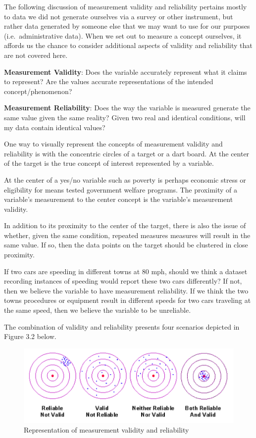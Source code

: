 \documentclass[
]{book}
\newenvironment{announcement}%
{%
  \par\vspace{\baselineskip}\noindent 
  \color{Announcement}\begin{itshape}%
  \par\vspace{\baselineskip}\noindent\ignorespaces 
}%
{%
  \end{itshape}\ignorespacesafterend 
}
\begin{document}
\begin{announcement}
The following discussion of measurement validity and reliability
pertains mostly to data we did not generate ourselves via a survey or
other instrument, but rather data generated by someone else that we may
want to use for our purposes (i.e.~administrative data). When we set out
to measure a concept ourselves, it affords us the chance to consider
additional aspects of validity and reliability that are not covered
here.
\end{announcement}

\textbf{Measurement Validity}: Does the variable accurately represent what it claims to represent? Are the values accurate representations of the intended concept/phenomenon?

\textbf{Measurement Reliability}: Does the way the variable is measured generate the same value given the same reality? Given two real and identical conditions, will my data contain identical values?

One way to visually represent the concepts of measurement validity and reliability is with the concentric circles of a target or a dart board. At the center of the target is the true concept of interest represented by a variable.

At the center of a yes/no variable such as poverty is perhaps economic stress or eligibility for means tested government welfare programs. The proximity of a variable's measurement to the center concept is the variable's measurement validity.

In addition to its proximity to the center of the target, there is also the issue of whether, given the same condition, repeated measures measures will result in the same value. If so, then the data points on the target should be clustered in close proximity.

If two cars are speeding in different towns at 80 mph, should we think a dataset recording instances of speeding would report these two cars differently? If not, then we believe the variable to have measurement reliability. If we think the two towns procedures or equipment result in different speeds for two cars traveling at the same speed, then we believe the variable to be unreliable.

The combination of validity and reliability presents four scenarios depicted in Figure 3.2 below.

\begin{figure}
\includegraphics[width=12.01in]{images/measure_targets} \caption{Representation of measurement validity and reliability}\label{fig:unnamed-chunk-6}
\end{figure}
\end{document}
